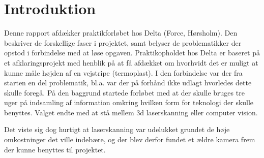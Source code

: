 \section{Introduktion}

Denne rapport afdækker praktikforløbet hos Delta (Force, Hørsholm). Den beskriver de forskellige faser i projektet, samt belyser de problematikker der opstod i forbindelse med at løse opgaven.
Praktikopholdet hos Delta er baseret på et afklaringsprojekt med henblik på at få afdækket om hvorhvidt det er muligt at kunne måle højden af en vejstripe (termoplast). I den forbindelse var der fra starten en del problematik, bl.a. var der på forhånd ikke udlagt hvorledes dette skulle foregå. På den baggrund startede forløbet med at der skulle bruges tre uger på indsamling af information omkring hvilken form for teknologi der skulle benyttes. Valget endte med at stå mellem 3d laserskanning eller computer vision.

Det viste sig dog hurtigt at laserskanning var udelukket grundet de høje omkostninger det ville indebære, og der blev derfor fundet et ældre kamera frem der kunne benyttes til projektet.
